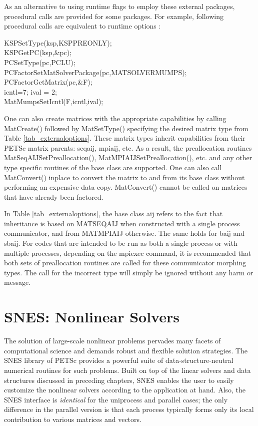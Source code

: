 As an alternative to using runtime flags to employ these external
packages,
procedural calls are provided for some packages. For example, following procedural calls
are equivalent to runtime options
   :
\begin{tabbing}
KSPSetType(ksp,KSPPREONLY);\\
KSPGetPC(ksp,\&pc);\\
PCSetType(pc,PCLU);\\
PCFactorSetMatSolverPackage(pc,MATSOLVERMUMPS);\\
PCFactorGetMatrix(pc,\&F);\\
icntl=7; ival = 2;\\
MatMumpsSetIcntl(F,icntl,ival);
\end{tabbing}

One can also create matrices with the appropriate
capabilities by calling MatCreate() followed by MatSetType()
specifying the desired matrix type from Table \ref{tab_externaloptions}.
These matrix types inherit capabilities from their PETSc matrix
parents: seqaij, mpiaij, etc.  As a result, the preallocation routines
MatSeqAIJSetPreallocation(), MatMPIAIJSetPreallocation(), etc. and any other type
specific routines of the base class are supported.  One can also
call MatConvert() inplace to convert the matrix to and from its base
class without performing an expensive data copy.  MatConvert() cannot be
called on matrices that have already been factored.

In Table \ref{tab_externaloptions}, the base class aij refers to the fact
that inheritance is based on MATSEQAIJ when constructed with a single
process communicator, and from MATMPIAIJ otherwise.  The same holds
for baij and sbaij.  For codes that are intended to be run as both a
single process or with multiple processes, depending on the mpiexec
command, it is recommended that both sets of preallocation routines
are called for these communicator morphing types.  The call for the
incorrect type will simply be ignored without any harm or message.


\cleardoublepage
\chapter{SNES: Nonlinear Solvers}
\label{chapter_snes}

The solution of large-scale nonlinear problems pervades many facets of
computational science and demands robust and flexible solution
strategies. The SNES library of PETSc provides a powerful suite of
data-structure-neutral numerical routines for such problems.  Built on
top of the linear solvers and data structures discussed in preceding
chapters, SNES enables the user to easily customize the nonlinear
solvers according to the application at hand.  Also, the SNES
interface is {\em identical} for the uniprocess and parallel cases;
the only difference in the parallel version is that each process
typically forms only its local contribution to various matrices and
vectors.


